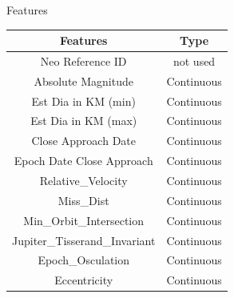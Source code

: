 \documentclass{beamer}
\begin{document}
\begin{frame}{Features}
\begin{table}[]
\begin{center}
\begin{tabular}{c|c}
\hline
\textbf{Features}             & \textbf{Type}        \\ \hline
Neo Reference ID              & not used             \\ \hline
Absolute Magnitude            & Continuous           \\ \hline
Est Dia in KM (min)           & Continuous           \\ \hline
Est Dia in KM (max)           & Continuous           \\ \hline
Close Approach Date           & Continuous           \\ \hline
Epoch Date Close Approach     & Continuous           \\ \hline
Relative\_Velocity            & Continuous           \\ \hline
Miss\_Dist                    & Continuous           \\ \hline
Min\_Orbit\_Intersection      & Continuous           \\ \hline
Jupiter\_Tisserand\_Invariant & Continuous           \\ \hline
Epoch\_Osculation             & Continuous           \\ \hline
Eccentricity                  & Continuous           \\ \hline

\end{tabular}
\end{center}
\label{tab_features}
\end{table}

\end{frame}
\end{document}
